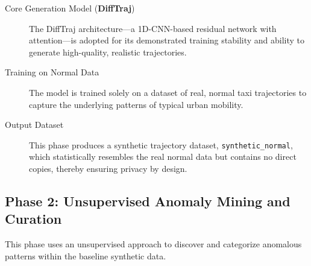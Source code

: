 \documentclass[runningheads]{llncs}
\begin{document}
\begin{description}
    \item[Core Generation Model (\textbf{DiffTraj})] The DiffTraj architecture---a 1D-CNN-based residual network with attention---is adopted for its demonstrated training stability and ability to generate high-quality, realistic trajectories.
    \item[Training on Normal Data] The model is trained solely on a dataset of real, normal taxi trajectories to capture the underlying patterns of typical urban mobility.
    \item[Output Dataset] This phase produces a synthetic trajectory dataset, \texttt{synthetic\_normal}, which statistically resembles the real normal data but contains no direct copies, thereby ensuring privacy by design.
\end{description}

\subsection{Phase 2: Unsupervised Anomaly Mining and Curation}
\label{sec:anomaly-mining}

This phase uses an unsupervised approach to discover and categorize anomalous patterns within the baseline synthetic data.
\end{document}
